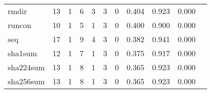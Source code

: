\begin{longtable}{lp{1.2cm}p{1.2cm}p{1.2cm}p{1.2cm}p{1.2cm}p{1.2cm}p{1.2cm}p{1.2cm}p{1.2cm}p{1.2cm}}
rmdir     &                                    13 &                                                  1 &                                                  6 &                                                  3 &                                                  3 &                                                  0 &                                              0.404 &                                              0.923 &                                              0.000 \\
runcon    &                                    10 &                                                  1 &                                                  5 &                                                  1 &                                                  3 &                                                  0 &                                              0.400 &                                              0.900 &                                              0.000 \\
seq       &                                    17 &                                                  1 &                                                  9 &                                                  4 &                                                  3 &                                                  0 &                                              0.382 &                                              0.941 &                                              0.000 \\
sha1sum   &                                    12 &                                                  1 &                                                  7 &                                                  1 &                                                  3 &                                                  0 &                                              0.375 &                                              0.917 &                                              0.000 \\
sha224sum &                                    13 &                                                  1 &                                                  8 &                                                  1 &                                                  3 &                                                  0 &                                              0.365 &                                              0.923 &                                              0.000 \\
sha256sum &                                    13 &                                                  1 &                                                  8 &                                                  1 &                                                  3 &                                                  0 &                                              0.365 &                                              0.923 &                                              0.000 \\

\end{longtable}
